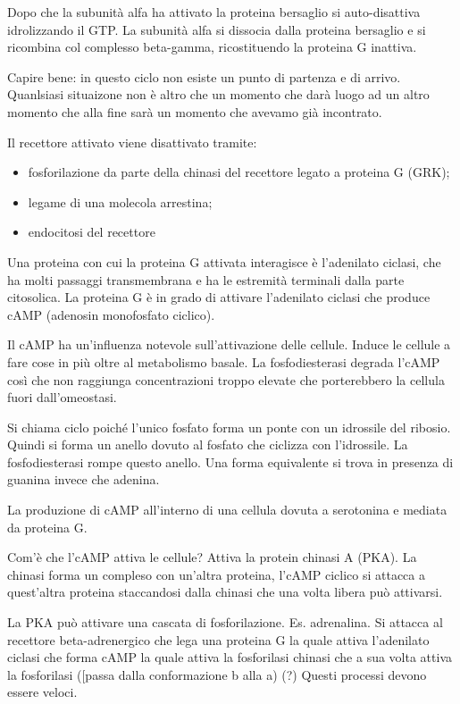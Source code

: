 \documentclass[]{article}
\begin{document}
Dopo che la subunità alfa ha attivato la proteina bersaglio si
auto-disattiva idrolizzando il GTP. La subunità alfa si dissocia dalla
proteina bersaglio e si ricombina col complesso beta-gamma,
ricostituendo la proteina G inattiva.

Capire bene: in questo ciclo non esiste un punto di partenza e di
arrivo. Quanlsiasi situaizone non è altro che un momento che darà luogo
ad un altro momento che alla fine sarà un momento che avevamo già
incontrato.

Il recettore attivato viene disattivato tramite:

\begin{itemize}
\itemsep1pt\parskip0pt
\item
  fosforilazione da parte della chinasi del recettore legato a proteina
  G (GRK);
\item
  legame di una molecola arrestina;
\item
  endocitosi del recettore
\end{itemize}

Una proteina con cui la proteina G attivata interagisce è l'adenilato
ciclasi, che ha molti passaggi transmembrana e ha le estremità terminali
dalla parte citosolica. La proteina G è in grado di attivare l'adenilato
ciclasi che produce cAMP (adenosin monofosfato ciclico).

Il cAMP ha un'influenza notevole sull'attivazione delle cellule. Induce
le cellule a fare cose in più oltre al metabolismo basale. La
fosfodiesterasi degrada l'cAMP così che non raggiunga concentrazioni
troppo elevate che porterebbero la cellula fuori dall'omeostasi.

Si chiama ciclo poiché l'unico fosfato forma un ponte con un idrossile
del ribosio. Quindi si forma un anello dovuto al fosfato che ciclizza
con l'idrossile. La fosfodiesterasi rompe questo anello. Una forma
equivalente si trova in presenza di guanina invece che adenina.

La produzione di cAMP all'interno di una cellula dovuta a serotonina e
mediata da proteina G.

Com'è che l'cAMP attiva le cellule? Attiva la protein chinasi A (PKA).
La chinasi forma un compleso con un'altra proteina, l'cAMP ciclico si
attacca a quest'altra proteina staccandosi dalla chinasi che una volta
libera può attivarsi.

La PKA può attivare una cascata di fosforilazione. Es. adrenalina. Si
attacca al recettore beta-adrenergico che lega una proteina G la quale
attiva l'adenilato ciclasi che forma cAMP la quale attiva la fosforilasi
chinasi che a sua volta attiva la fosforilasi ({[}passa dalla
conformazione b alla a) (?) Questi processi devono essere veloci.
\end{document}
